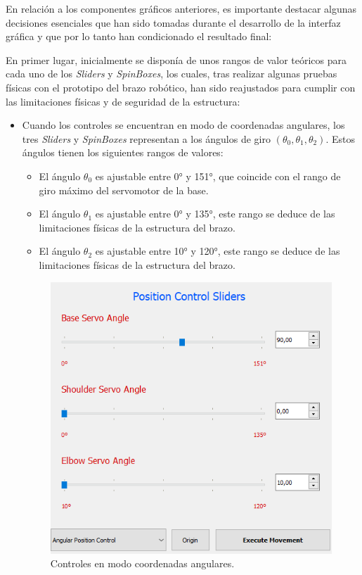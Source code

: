 En relación a los componentes gráficos anteriores, es importante destacar algunas decisiones esenciales que han sido tomadas durante el desarrollo de la interfaz gráfica y que por lo tanto han condicionado el resultado final:

En primer lugar, inicialmente se disponía de unos rangos de valor teóricos para cada uno de los \textit{Sliders} y \textit{SpinBoxes}, los cuales, tras realizar algunas pruebas físicas con el prototipo del brazo robótico, han sido reajustados para cumplir con las limitaciones físicas y de seguridad de la estructura:
    \begin{itemize}
        \item Cuando los controles se encuentran en modo de coordenadas angulares, los tres \textit{Sliders} y \textit{SpinBoxes} representan a los ángulos de giro $(\theta_{0}, \theta_{1}, \theta_{2})$. Estos ángulos tienen los siguientes rangos de valores:
        \begin{itemize}
            \item El ángulo $\theta_{0}$ es ajustable entre 0° y 151°, que coincide con el rango de giro máximo del servomotor de la base.
            \item El ángulo $\theta_{1}$ es ajustable entre 0° y 135°, este rango se deduce de las limitaciones físicas de la estructura del brazo.
            \item El ángulo $\theta_{2}$ es ajustable entre 10° y 120°, este rango se deduce de las limitaciones físicas de la estructura del brazo.
        \end{itemize}
        \begin{figure}[H]
            \centering
            \includegraphics[width=0.55\linewidth]{pictures/Joints_Gui.PNG}
            \caption{Controles en modo coordenadas angulares.}
            \label{fig:ui_joint}
         \end{figure}

\end{itemize}
